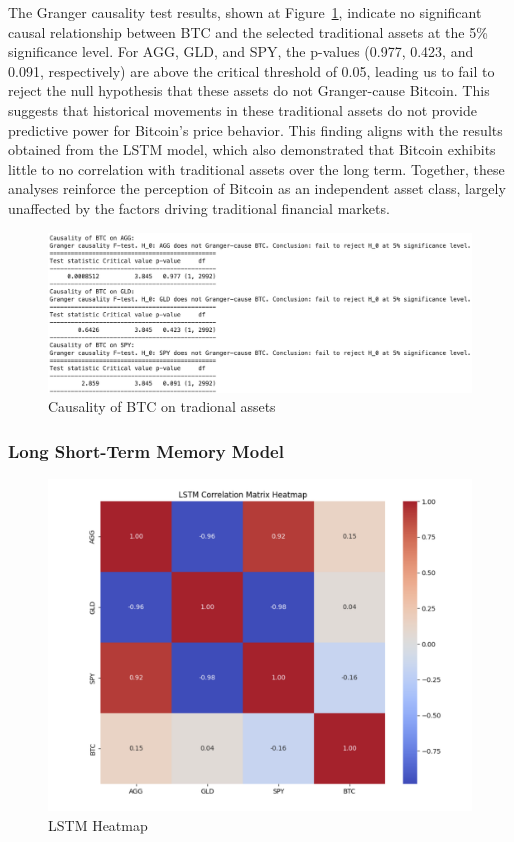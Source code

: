 \documentclass{article}
\begin{document}
The Granger causality test results, shown at Figure~\ref{var}, indicate no significant causal relationship between BTC and the selected traditional assets at the 5\% significance level. For AGG, GLD, and SPY, the p-values (0.977, 0.423, and 0.091, respectively) are above the critical threshold of 0.05, leading us to fail to reject the null hypothesis that these assets do not Granger-cause Bitcoin. This suggests that historical movements in these traditional assets do not provide predictive power for Bitcoin's price behavior. This finding aligns with the results obtained from the LSTM model, which also demonstrated that Bitcoin exhibits little to no correlation with traditional assets over the long term. Together, these analyses reinforce the perception of Bitcoin as an independent asset class, largely unaffected by the factors driving traditional financial markets.


\begin{figure}
    \centering
    \includegraphics[width=1\linewidth]{figure/var.png}
    \caption{Causality of BTC on tradional assets}
    \label{var}
\end{figure}


\subsubsection{Long Short-Term Memory Model}

\begin{figure}
    \centering
    \includegraphics[width=0.7\linewidth]{figure/lstm_correlation_heatmap_with_labels.png}
    \caption{LSTM Heatmap}
    \label{lstmh}
\end{figure}
\end{document}
